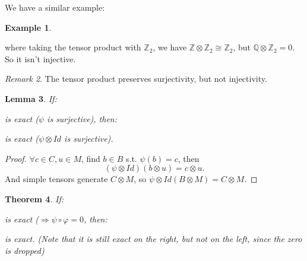 \documentclass[12pt]{amsbook}
\theoremstyle{plain}
\newtheorem{theorem}{Theorem}[chapter]
\numberwithin{section}{chapter}
\numberwithin{equation}{chapter}
\newtheorem{lem}[theorem]{Lemma}
\theoremstyle{definition}
\newtheorem{Ex}[theorem]{Example}
\theoremstyle{remark}
\newtheorem{rem}[theorem]{Remark}
\newcommand{\z}{\mathbb{Z}}
\newcommand{\Q}{\mathbb{Q}}
\newcommand{\tens}{\otimes}
\renewcommand{\phi}{\varphi}
\begin{document}
We have a similar example: 
\begin{Ex}
\begin{center}
\end{center}
where taking the tensor product with $\z_2$, we have $\z \tens \z_2 \cong \z_2$, but $\Q \tens \z_2 = 0$. So it isn't injective. 
\end{Ex}

\begin{rem}
The tensor product preserves surjectivity, but not injectivity. 
\end{rem}
\begin{lem}
If:
\begin{center}
\end{center}
is exact ($\psi$ is surjective), then:
\begin{center}
\end{center}
is exact ($\psi \tens Id$ is surjective).
\end{lem}

\begin{proof}
$\forall c \in C,u \in M$, find $b \in B$ s.t. $\psi(b) = c$,
then 
$$
(\psi \tens Id)(b \tens u) = c \tens u.
$$
 And simple tensors generate $C \tens M$, so $\psi \tens Id(B \tens M) = C \tens M$. 
\end{proof}

\begin{theorem}
If:
\begin{center}
\end{center}
is exact ($\Rightarrow \psi \circ \phi = 0$, then:
\begin{center}
\end{center}
is exact. (Note that it is still exact on the right, but not on the left, since the zero is dropped)
\end{theorem}
\end{document}
